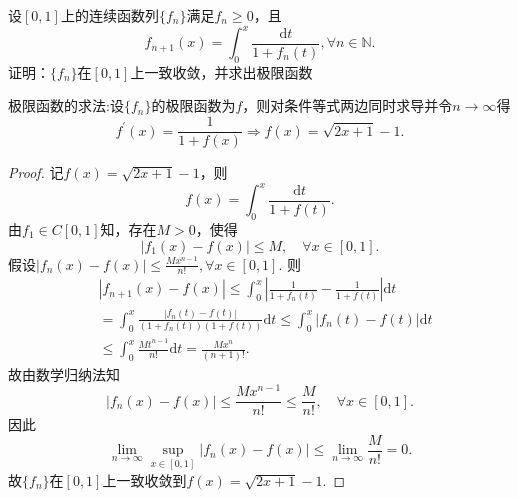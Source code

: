\documentclass[../../main.tex]{subfiles}
\begin{document}
\begin{example}
设\( [0,1] \)上的连续函数列\( \{f_n\} \)满足\( f_n \geqslant 0 \)，且
\[
f_{n+1}(x) = \int_0^x \frac{\mathrm{d}t}{1 + f_n(t)}, \forall n \in \mathbb{N}.
\]
证明：\( \{f_n\} \)在\( [0,1] \)上一致收敛，并求出极限函数
\end{example}
\begin{note}
极限函数的求法:设\( \{f_n\} \)的极限函数为\( f \)，则对条件等式两边同时求导并令\( n\rightarrow \infty \)得
\[
f^\prime(x) = \frac{1}{1 + f(x)} \Longrightarrow f(x) = \sqrt{2x + 1} - 1.
\]
\end{note}
\begin{proof}
记\( f(x) = \sqrt{2x + 1} - 1 \)，则
\[
f(x) = \int_0^x{\frac{\mathrm{d}t}{1 + f(t)}}.
\]
由\( f_1 \in C[0,1] \)知，存在\( M > 0 \)，使得
\[
|f_1(x) - f(x)| \leqslant M,\quad \forall x \in [0,1].
\]
假设\( |f_n(x) - f(x)| \leqslant \frac{Mx^{n - 1}}{n!},\forall x \in [0,1] \). 则
\begin{align*}
&|f_{n + 1}(x) - f(x)| \leqslant \int_0^x{\left| \frac{1}{1 + f_n(t)} - \frac{1}{1 + f(t)} \right|}\mathrm{d}t \\
&= \int_0^x{\frac{|f_n(t) - f(t)|}{(1 + f_n(t))(1 + f(t))}\mathrm{d}t} \leqslant \int_0^x{|f_n(t) - f(t)|\mathrm{d}t} \\
&\leqslant \int_0^x{\frac{Mt^{n - 1}}{n!}\mathrm{d}t} = \frac{Mx^n}{(n + 1)!}.
\end{align*}
故由数学归纳法知
\[
|f_n(x) - f(x)| \leqslant \frac{Mx^{n - 1}}{n!} \leqslant \frac{M}{n!},\quad \forall x \in [0,1].
\]
因此
\[
\lim_{n \to \infty} \sup_{x \in [0,1]} |f_n(x) - f(x)| \leqslant \lim_{n \to \infty} \frac{M}{n!} = 0.
\]
故\( \{f_n\} \)在\( [0,1] \)上一致收敛到\( f(x) = \sqrt{2x + 1} - 1 \).

\end{proof}
\end{document}
